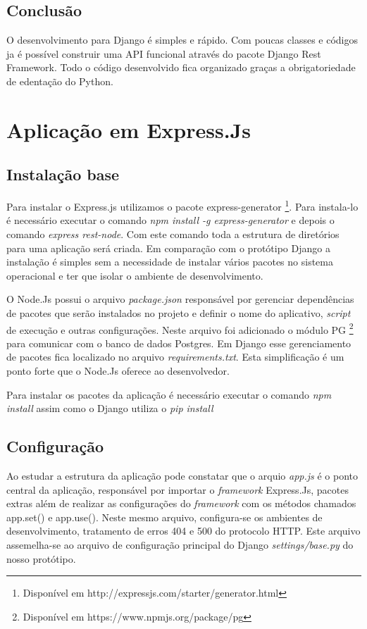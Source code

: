 \subsection{Conclusão}

   O desenvolvimento para Django é simples e rápido. Com poucas classes e códigos ja é possível construir uma API funcional
   através do pacote Django Rest Framework. Todo o código desenvolvido fica organizado graças a obrigatoriedade de edentação
   do Python.

\section{Aplicação em Express.Js}
\label{escopo-projeto}

\subsection{Instalação base}

  Para instalar o Express.js utilizamos o pacote express-generator \footnote{Disponível em http://expressjs.com/starter/generator.html}.
  Para instala-lo é necessário executar o comando \textit{npm install -g express-generator} e depois o comando \textit{express rest-node}.
  Com este comando toda a estrutura de diretórios para uma aplicação será criada. Em comparação com o protótipo Django a instalação é
  simples sem a necessidade de instalar vários pacotes no sistema operacional e ter que isolar o ambiente de desenvolvimento.
  
  O Node.Js possui o arquivo \textit{package.json} responsável por gerenciar dependências de pacotes que serão instalados no projeto 
  e definir o nome do aplicativo, \textit{script} de execução e outras configurações. Neste arquivo foi adicionado o módulo PG \footnote{Disponível em https://www.npmjs.org/package/pg}
  para comunicar com o banco de dados Postgres. Em Django esse gerenciamento de pacotes fica localizado no arquivo
  \textit{requirements.txt}. Esta simplificação é um ponto forte que o Node.Js oferece ao desenvolvedor.
  
  Para instalar os pacotes da aplicação é necessário executar o comando \textit{npm install} assim como o Django utiliza o 
  \textit{pip install} 

\subsection{Configuração}

  Ao estudar a estrutura da aplicação pode constatar que o arquio \textit{app.js} é o ponto central da aplicação, responsável por importar
  o \textit{framework} Express.Js, pacotes extras além de realizar as configurações do \textit{framework} com os métodos chamados app.set() e app.use().
  Neste mesmo arquivo, configura-se os ambientes de desenvolvimento, tratamento de erros 404 e 500 do protocolo HTTP. Este arquivo
  assemelha-se ao arquivo de configuração principal do Django \textit{settings/base.py} do nosso protótipo.

